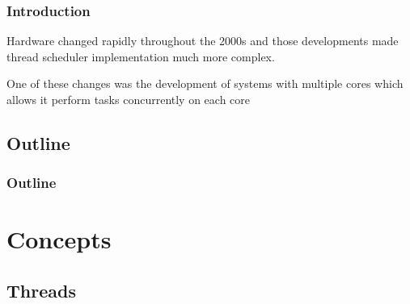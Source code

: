 \documentclass{beamer}
\newcommand{\linespace}{\vskip 0.25cm}
\begin{document}
\begin{frame}
\frametitle{Introduction}

Hardware changed rapidly throughout the 2000s and those developments made thread scheduler implementation much more complex.

\linespace

One of these changes was the development of systems with multiple cores which allows it perform tasks concurrently on each core


\end{frame}


\subsection*{Outline}

\begin{frame}
  \frametitle{Outline}
  \tableofcontents[hideallsubsections]
\end{frame}

\section[Concepts]{Concepts}

\subsection[Threads]{Threads}
\end{document}
